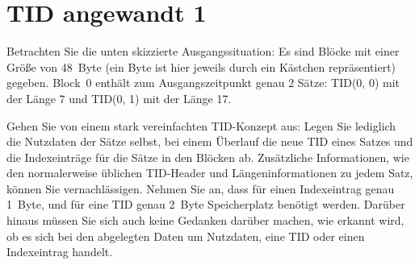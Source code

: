 \beamertxt{\pagebreak}
\section{TID angewandt 1}
\label{sec:TID_angewandt1}
Betrachten Sie die unten skizzierte Ausgangssituation: Es sind Blöcke mit einer Größe von 48~Byte (ein Byte ist hier jeweils durch ein Kästchen repräsentiert) gegeben. Block~0 enthält zum Ausgangszeitpunkt genau 2 Sätze: TID(0, 0) mit der Länge 7 und TID(0, 1) mit der Länge 17.

Gehen Sie von einem stark vereinfachten TID-Konzept aus: Legen Sie lediglich die Nutzdaten der Sätze selbst, bei einem Überlauf die neue TID eines Satzes und die Indexeinträge für die Sätze in den Blöcken ab. Zusätzliche Informationen, wie den normalerweise üblichen TID-Header und Längeninformationen zu jedem Satz, können Sie vernachlässigen. Nehmen Sie an, dass für einen Indexeintrag genau 1~Byte, und für eine TID genau 2~Byte Speicherplatz benötigt werden. Darüber hinaus müssen Sie sich auch keine Gedanken darüber machen, wie erkannt wird, ob es sich bei den abgelegten Daten um Nutzdaten, eine TID oder einen Indexeintrag handelt.

